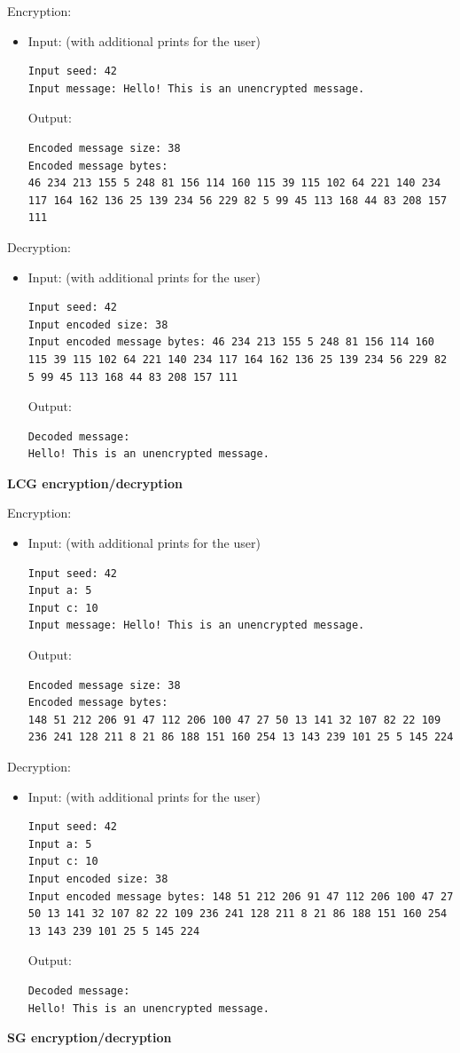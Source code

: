 \documentclass[a4paper,10pt]{article}
\begin{document}
Encryption:
\begin{itemize}
\item Input: (with additional prints for the user)
\begin{lstlisting}[style = stdio]
Input seed: 42
Input message: Hello! This is an unencrypted message.
\end{lstlisting}

  Output:
\begin{lstlisting}[style = stdio]
Encoded message size: 38
Encoded message bytes: 
46 234 213 155 5 248 81 156 114 160 115 39 115 102 64 221 140 234 117 164 162 136 25 139 234 56 229 82 5 99 45 113 168 44 83 208 157 111
\end{lstlisting}
\end{itemize}
Decryption:
\begin{itemize}
\item Input: (with additional prints for the user)
\begin{lstlisting}[style = stdio]
Input seed: 42
Input encoded size: 38
Input encoded message bytes: 46 234 213 155 5 248 81 156 114 160 115 39 115 102 64 221 140 234 117 164 162 136 25 139 234 56 229 82 5 99 45 113 168 44 83 208 157 111
\end{lstlisting}

  Output:
\begin{lstlisting}[style = stdio]
Decoded message:
Hello! This is an unencrypted message.
\end{lstlisting}
\end{itemize}
\textbf{LCG encryption/decryption}

Encryption:
\begin{itemize}
\item Input: (with additional prints for the user)
\begin{lstlisting}[style = stdio]
Input seed: 42
Input a: 5
Input c: 10
Input message: Hello! This is an unencrypted message.
\end{lstlisting}

  Output:
\begin{lstlisting}[style = stdio]
Encoded message size: 38
Encoded message bytes:
148 51 212 206 91 47 112 206 100 47 27 50 13 141 32 107 82 22 109 236 241 128 211 8 21 86 188 151 160 254 13 143 239 101 25 5 145 224 
\end{lstlisting}
\end{itemize}
Decryption:
\begin{itemize}
\item Input: (with additional prints for the user)
\begin{lstlisting}[style = stdio]
Input seed: 42
Input a: 5
Input c: 10
Input encoded size: 38
Input encoded message bytes: 148 51 212 206 91 47 112 206 100 47 27 50 13 141 32 107 82 22 109 236 241 128 211 8 21 86 188 151 160 254 13 143 239 101 25 5 145 224
\end{lstlisting}

  Output:
\begin{lstlisting}[style = stdio]
Decoded message:
Hello! This is an unencrypted message.
\end{lstlisting}
\end{itemize}
\textbf{SG encryption/decryption}
\end{document}
